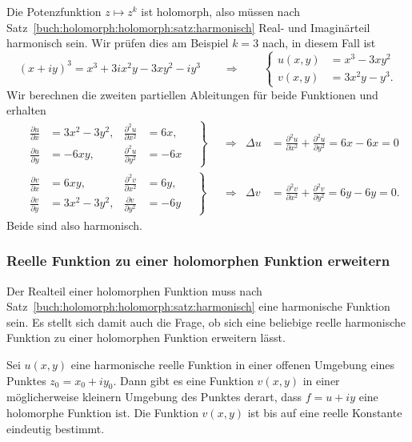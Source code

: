 \begin{beispiel}
\label{buch:holomorph:holomorph:bsp:zkholomorph}
Die Potenzfunktion $z\mapsto z^k$ ist holomorph, also müssen nach
Satz~\ref{buch:holomorph:holomorph:satz:harmonisch} Real- und
Imaginärteil harmonisch sein.
Wir prüfen dies am Beispiel $k=3$ nach, in diesem Fall ist
\begin{equation*}
(x+iy)^3
=
x^3 +3ix^2y - 3xy^2 -iy^3
\qquad\Rightarrow\qquad
\left\{
\begin{aligned}
u(x,y)
&=
x^3-3xy^2
\\
v(x,y)
&=
3x^2y-y^3.
\end{aligned}
\right.
\end{equation*}
Wir berechnen die zweiten partiellen Ableitungen für beide
Funktionen und erhalten
\begin{align*}
&\left.
\begin{aligned}
\frac{\partial u}{\partial x} &= 3x^2 -3y^2,
&
\frac{\partial^2 u}{\partial x^2} &= 6x,
\\
\frac{\partial u}{\partial y} &= -6xy,
&
\frac{\partial^2 u}{\partial y^2} &= -6x
\end{aligned}
\quad
\right\}
&&\Rightarrow&
\Delta u
&=
\frac{\partial^2 u}{\partial x^2}
+
\frac{\partial^2 u}{\partial y^2}
=
6x-6x = 0
\\
&
\left.\begin{aligned}
\frac{\partial v}{\partial x} &= 6xy,
&
\frac{\partial^2 v}{\partial x^2} &= 6y,
\\
\frac{\partial v}{\partial y} &= 3x^2-3y^2,
&
\frac{\partial v}{\partial y^2} &= -6y
\end{aligned}
\quad
\right\}
&&\Rightarrow&
\Delta v
&=
\frac{\partial^2 v}{\partial x^2}
+
\frac{\partial^2 v}{\partial y^2}
=
6y-6y
=
0.
\end{align*}
Beide sind also harmonisch.
\end{beispiel}

%
%
\subsubsection{Reelle Funktion zu einer holomorphen Funktion erweitern}
Der Realteil einer holomorphen Funktion muss nach
Satz~\ref{buch:holomorph:holomorph:satz:harmonisch}
eine harmonische Funktion sein.
Es stellt sich damit auch die Frage, ob sich eine beliebige
reelle harmonische Funktion zu einer holomorphen Funktion 
erweitern lässt.

\begin{satz}
\label{buch:holomorph:holomorph:satz:utov}
Sei $u(x,y)$ eine harmonische reelle Funktion in einer offenen Umgebung
eines Punktes $z_0 = x_0+iy_0$.
Dann gibt es eine Funktion $v(x,y)$ in einer möglicherweise kleinern
Umgebung des Punktes derart, dass $f=u+iy$ eine holomorphe Funktion ist.
Die Funktion $v(x,y)$ ist bis auf eine reelle Konstante eindeutig
bestimmt.
\end{satz}

